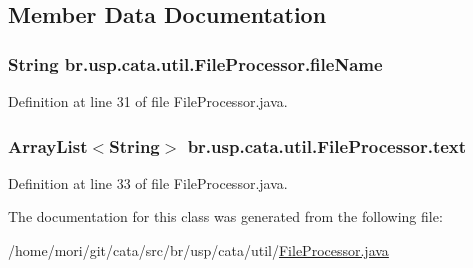 \subsection{Member Data Documentation}
\hypertarget{classbr_1_1usp_1_1cata_1_1util_1_1_file_processor_a6c9dd23556292c88432a330db3aae182}{
\subsubsection[{file\+Name}]{\setlength{\rightskip}{0pt plus 5cm}String br.\+usp.\+cata.\+util.\+File\+Processor.\+file\+Name\hspace{0.3cm}{\ttfamily [private]}}}\label{classbr_1_1usp_1_1cata_1_1util_1_1_file_processor_a6c9dd23556292c88432a330db3aae182}


Definition at line 31 of file File\+Processor.\+java.

\hypertarget{classbr_1_1usp_1_1cata_1_1util_1_1_file_processor_abc3392e9ccb3a12ea7074b43e5a2f1c5}{
\subsubsection[{text}]{\setlength{\rightskip}{0pt plus 5cm}Array\+List$<$String$>$ br.\+usp.\+cata.\+util.\+File\+Processor.\+text\hspace{0.3cm}{\ttfamily [private]}}}\label{classbr_1_1usp_1_1cata_1_1util_1_1_file_processor_abc3392e9ccb3a12ea7074b43e5a2f1c5}


Definition at line 33 of file File\+Processor.\+java.



The documentation for this class was generated from the following file\+:\begin{DoxyCompactItemize}
\item 
/home/mori/git/cata/src/br/usp/cata/util/\hyperlink{_file_processor_8java}{File\+Processor.\+java}\end{DoxyCompactItemize}
